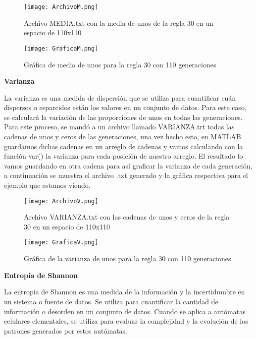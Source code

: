 \documentclass{article}
\begin{document}
	\begin{figure}[h]
		\centering       
		\texttt{[image: ArchivoM.png]}
		\caption{Archivo MEDIA.txt con la media de unos de la regla 30 en un espacio de 110x110}
		\label{fig:mi_imagen1}
	\end{figure}
	\vspace{300pt}
	\begin{figure}[h]
		\centering       
		\texttt{[image: GraficaM.png]}
		\caption{Gráfica de media de unos para la regla 30 con 110 generaciones}
		\label{fig:mi_imagen1}
	\end{figure}
	
	\textbf{Varianza}
	\newline
	\newline
	
	La varianza es una medida de dispersión que se utiliza para cuantificar cuán dispersos o esparcidos están los valores en un conjunto de datos. Para este caso, se calculará la variación de las proporciones de unos en todas las generaciones. 
	Para este proceso, se mandó a un archivo llamado VARIANZA.trt todas las cadenas de unos y ceros de las generaciones, una vez hecho esto, en MATLAB guardamos dichas cadenas en un arreglo de cadenas y vamos calculando con la función var() la varianza para cada posición de nuestro arreglo. El resultado lo vamos guardando en otra cadena para así graficar la varianza de cada generación, a continuación se muestra el archivo .txt generado y la gráfica respectiva para el ejemplo que estamos viendo. 
	
	\begin{figure}[h]
		\centering       
		\texttt{[image: ArchivoV.png]}
		\caption{Archivo VARIANZA.txt con las cadenas de unos y ceros de la regla 30 en un espacio de 110x110}
		\label{fig:mi_imagen1}
	\end{figure}
	\vspace{300pt}
	\begin{figure}[h]
		\centering       
		\texttt{[image: GraficaV.png]}
		\caption{Gráfica de la varianza de unos para la regla 30 con 110 generaciones}
		\label{fig:mi_imagen1}
	\end{figure}
	
	\textbf{Entropía de Shannon}
	\newline
	\newline
	
	La entropía de Shannon es una medida de la información y la incertidumbre en un sistema o fuente de datos. Se utiliza para cuantificar la cantidad de información o desorden en un conjunto de datos. Cuando se aplica a autómatas celulares elementales, se utiliza para evaluar la complejidad y la evolución de los patrones generados por estos autómatas.
	
\end{document}
